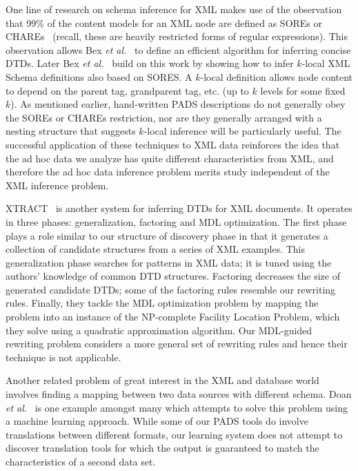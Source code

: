 One line of research on schema inference for XML makes use of the 
observation that 99\% of the content models for an XML node are defined as
SOREs or CHAREs~\cite{martens+:expressiveness-xml-schema} (recall, these
are heavily restricted forms of regular expressions).  
This observation allows Bex {\em et al.}~\cite{bex+:dtd-inference} to define
an efficient algorithm for inferring concise DTDs.  Later 
Bex {\em et al.}~\cite{bex+:inferring-xml-schema} build on this work 
by showing how to infer $k$-local XML Schema definitions also based on
SORES.  A $k$-local definition allows node content to depend on the parent
tag, grandparent tag, etc. (up to $k$ levels for some fixed $k$).
As mentioned earlier, hand-written PADS descriptions do not generally obey
the SOREs or CHAREs restriction, nor are they generally arranged with a nesting
structure that suggests $k$-local inference will be particularly useful.
The successful application of these techniques to XML data reinforces 
the idea that the ad hoc data we analyze has quite different characteristics
from XML, and therefore the ad hoc data inference problem merits study
independent of the XML inference problem.

XTRACT~\cite{garofalakis+:xtract} is another system for inferring DTDs
for XML documents.  It operates in three phases: generalization,
factoring and MDL optimization.  The first phase plays a role similar to
our structure of discovery phase in that it generates a
collection of candidate structures from a series of XML examples.
This generalization phase searches for patterns in XML
data; it is tuned using the authors' knowledge of common DTD
structures.  Factoring decreases the size of generated candidate DTDs;
some of the factoring rules resemble our rewriting rules.
Finally, they tackle the MDL optimization problem by mapping the
problem into an instance of the NP-complete Facility Location Problem,
which they solve using a quadratic approximation algorithm.
Our MDL-guided rewriting problem considers a more general set of
rewriting rules and hence their technique is not applicable.

Another related problem of great interest in the XML and database world
involves finding a mapping between two data sources with different schema.
Doan {\em et al.}~\cite{doan+:disparate-data-sources} is one example amongst
many which attempts to solve this problem using a machine learning approach.
While some of our PADS tools do involve translations between
different formats, our learning system does not attempt to discover
translation tools for which the output is guaranteed to match 
the characteristics of a second data set.


